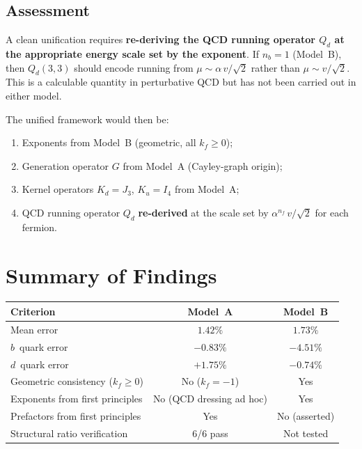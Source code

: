 \documentclass[11pt]{article}
\begin{document}
\subsection{Assessment}

A clean unification requires \textbf{re-deriving the QCD running operator
$Q_d$ at the appropriate energy scale set by the exponent}.  If $n_b=1$
(Model~B), then $Q_d(3,3)$ should encode running from
$\mu \sim \alpha\, v/\sqrt{2}$ rather than $\mu \sim v/\sqrt{2}$.
This is a calculable quantity in perturbative QCD but has not been
carried out in either model.

The unified framework would then be:
\begin{enumerate}
  \item Exponents from Model~B (geometric, all $k_f \geq 0$);
  \item Generation operator $G$ from Model~A (Cayley-graph origin);
  \item Kernel operators $K_d = J_3$, $K_u = I_4$ from Model~A;
  \item QCD running operator $Q_d$ \textbf{re-derived} at the scale
    set by $\alpha^{n_f}\, v/\sqrt{2}$ for each fermion.
\end{enumerate}

\section{Summary of Findings}

\begin{center}
\renewcommand{\arraystretch}{1.3}
\begin{tabular}{p{5cm}cc}
\toprule
\textbf{Criterion} & \textbf{Model~A} & \textbf{Model~B} \\
\midrule
Mean error & $1.42\%$ & $1.73\%$ \\
$b$~quark error & $-0.83\%$ & $-4.51\%$ \\
$d$~quark error & $+1.75\%$ & $-0.74\%$ \\
Geometric consistency ($k_f \geq 0$) & \color{alert}No ($k_f=-1$) & \color{modelA}Yes \\
Exponents from first principles & No (QCD dressing ad hoc) & \color{modelA}Yes \\
Prefactors from first principles & \color{modelA}Yes & No (asserted) \\
Structural ratio verification & \color{modelA}6/6 pass & Not tested \\
\bottomrule
\end{tabular}
\end{center}
\end{document}
